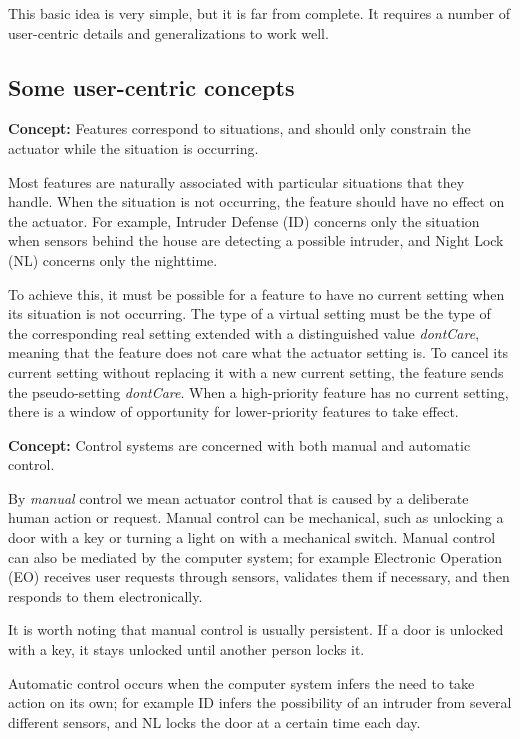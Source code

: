 \documentclass[conference]{IEEEtran}
\begin{document}
This basic idea is very simple, but it is far from complete.
It requires a number of
user-centric details and generalizations to work well.

\subsection{Some user-centric concepts}
\label{sec:users}

\vspace{2mm}
{\bf Concept:} Features correspond to situations, and should only 
constrain the actuator while the situation is occurring.

Most features are naturally
associated with particular situations that they handle.
When the situation is not occurring, the feature should have no
effect on the actuator.
For example, Intruder
Defense (ID) concerns only the situation when sensors behind the house
are detecting a possible intruder, and Night Lock (NL)
concerns only the nighttime.

To achieve this, 
it must be possible for a feature to have no current setting when
its situation is not occurring.
The type of a virtual setting must be the type
of the corresponding real setting extended with a distinguished value
{\it dontCare},
meaning that the feature does not care what the actuator setting is.
To cancel its current setting without replacing it with a new
current setting, the feature sends the pseudo-setting {\it dontCare}.
When a high-priority feature has no current setting, there is a
window of opportunity for lower-priority features to take effect.

\vspace{2mm}
{\bf Concept:} Control systems are concerned with
both manual and automatic control.

By {\it manual} control we mean actuator control that is caused by a
deliberate human action or request.
Manual control can be mechanical, such as unlocking a door with a key
or turning a light on with a mechanical switch.
Manual control can also be mediated by the computer system;
for example Electronic Operation (EO) receives user
requests through sensors,
validates them if necessary, and then responds to them electronically.

It is worth noting that manual control is usually persistent.
If a door is unlocked with a key, it stays unlocked until another
person locks it.

Automatic control occurs when the computer system infers the need to
take action on its own;
for example ID infers the possibility of an 
intruder from several different sensors, and NL locks
the door at a certain time each day.
\end{document}
